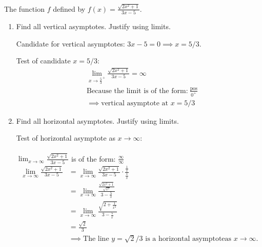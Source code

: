 \documentclass[nooutcomes,handout]{ximera}
\begin{document}
\begin{problem}
The function $f$ defined by $\displaystyle f(x) = \frac{\sqrt{2x^2 + 1}}{3x-5}$.
  \begin{enumerate}
    \item
      Find all vertical asymptotes.  Justify using limits.
 \begin{freeResponse}
        Candidate for vertical asymptotes: $3x - 5 = 0 \implies x = 5/3$.

        Test of candidate $x = 5/3$:
        \begin{align*}
          &\lim_{x \to \frac{5}{3}^+} \frac{\sqrt{2x^2 + 1}}{3x-5} = \infty\\
	&\text{Because the limit is of the form:}\ \frac{\text{pos}}{0^+}\\
          &\implies \mbox{vertical asymptote at $x = 5/3$}
        \end{align*}

       \end{freeResponse}

    \item
      Find all horizontal asymptotes.  Justify using limits.
 

        \begin{freeResponse}
        Test of horizontal asymptote as $x \to \infty$:\\\\
        $\lim_{x \to \infty} \frac{\sqrt{2x^2 + 1}}{3x-5}$ is of the form: $\frac{\infty}{\infty}$
        \begin{align*}
                   \lim_{x \to \infty} \frac{\sqrt{2x^2 + 1}}{3x-5}
          &= \lim_{x \to \infty} \frac{\sqrt{2x^2 + 1}}{3x-5} \cdot \frac{\frac{1}{x}}{\frac{1}{x}} \\
          &= \lim_{x \to \infty}  \frac{\frac{\sqrt{2x^2 + 1}}{\sqrt{x^2}}}{3 - \frac{5}{x}}\\
          &= \lim_{x \to \infty}  \frac{\sqrt{2 + \frac{1}{x^2}}}{3 - \frac{5}{x}} \\
          &= \frac{\sqrt{2}}{3} \\
          &\implies \mbox{The line $y = \sqrt{2}/3$ is a horizontal asymptoteas $x \to \infty$.}
        \end{align*}


\end{freeResponse}
\end{enumerate}
\end{problem}
\end{document}
